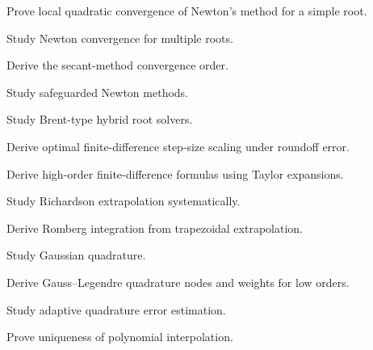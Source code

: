 \begin{exercise}[4]
Prove local quadratic convergence of Newton's method for a simple root.
\end{exercise}

\begin{exercise}[4]
Study Newton convergence for multiple roots.
\end{exercise}

\begin{exercise}[4]
Derive the secant-method convergence order.
\end{exercise}

\begin{exercise}[4]
Study safeguarded Newton methods.
\end{exercise}

\begin{exercise}[4]
Study Brent-type hybrid root solvers.
\end{exercise}

\begin{exercise}[4]
Derive optimal finite-difference step-size scaling under roundoff error.
\end{exercise}

\begin{exercise}[4]
Derive high-order finite-difference formulas using Taylor expansions.
\end{exercise}

\begin{exercise}[4]
Study Richardson extrapolation systematically.
\end{exercise}

\begin{exercise}[4]
Derive Romberg integration from trapezoidal extrapolation.
\end{exercise}

\begin{exercise}[4]
Study Gaussian quadrature.
\end{exercise}

\begin{exercise}[4]
Derive Gauss--Legendre quadrature nodes and weights for low orders.
\end{exercise}

\begin{exercise}[4]
Study adaptive quadrature error estimation.
\end{exercise}

\begin{exercise}[4]
Prove uniqueness of polynomial interpolation.
\end{exercise}


